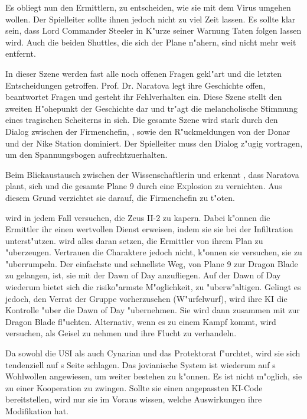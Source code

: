 Es obliegt nun den Ermittlern, zu entscheiden, wie sie mit dem Virus umgehen wollen. Der Spielleiter sollte ihnen jedoch nicht zu viel Zeit lassen. Es sollte klar sein, dass Lord Commander Steeler in K"urze seiner Warnung Taten folgen lassen wird. Auch die beiden Shuttles, die sich der Plane n"ahern, sind nicht mehr weit entfernt.

\vfill
\newpage

\begin{remarks}
	In dieser Szene werden fast alle noch offenen Fragen gekl"art und die letzten Entscheidungen getroffen. Prof. Dr. Naratova legt ihre Geschichte offen, beantwortet Fragen und gesteht ihr Fehlverhalten ein. Diese Szene stellt den zweiten H"ohepunkt der Geschichte dar und tr"agt die melancholische Stimmung eines tragischen Scheiterns in sich. Die gesamte Szene wird stark durch den Dialog zwischen der Firmenchefin, \xl{}, \ml{} sowie den R"uckmeldungen von der Donar und der Nike Station dominiert. Der Spielleiter muss den Dialog z"ugig vortragen, um den Spannungsbogen aufrechtzuerhalten.

	Beim Blickaustausch zwischen der Wissenschaftlerin und \xl{} erkennt \xl{}, dass Naratova plant, sich und die gesamte Plane 9 durch eine Explosion zu vernichten. Aus diesem Grund verzichtet sie darauf, die Firmenchefin zu t"oten.

	\xl{} wird in jedem Fall versuchen, die Zeus II-2 zu kapern. Dabei k"onnen die Ermittler ihr einen wertvollen Dienst erweisen, indem sie sie bei der Infiltration unterst"utzen. \xl{} wird alles daran setzen, die Ermittler von ihrem Plan zu "uberzeugen. Vertrauen die Charaktere \xl{} jedoch nicht, k"onnen sie versuchen, sie zu "uberrumpeln. Der einfachste und schnellste Weg, von Plane 9 zur Dragon Blade zu gelangen, ist, sie mit der Dawn of Day anzufliegen. Auf der Dawn of Day wiederum bietet sich die risiko"armste M"oglichkeit, \xl{} zu "uberw"altigen. Gelingt es \xl{} jedoch, den Verrat der Gruppe vorherzusehen (W"urfelwurf), wird ihre KI die Kontrolle "uber die Dawn of Day "ubernehmen. Sie wird dann zusammen mit \ml{} zur Dragon Blade fl"uchten. Alternativ, wenn es zu einem Kampf kommt, wird \xl{} versuchen, \ml{} als Geisel zu nehmen und ihre Flucht zu verhandeln.

	Da \ml{} sowohl die USI als auch Cynarian und das Protektorat f"urchtet, wird sie sich tendenziell auf \xl{}s Seite schlagen. Das jovianische System ist wiederum auf \ml{}s Wohlwollen angewiesen, um weiter bestehen zu k"onnen. Es ist nicht m"oglich, sie zu einer Kooperation zu zwingen. Sollte sie einen angepassten KI-Code bereitstellen, wird nur sie im Voraus wissen, welche Auswirkungen ihre Modifikation hat.


\end{remarks}
